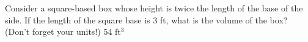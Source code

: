 {Consider a square-based box whose height is twice the length of the base of the side.  If the length of the square base is 3 ft, what is the volume of the box? (Don't forget your units!)}
{54 ft$^3$}
